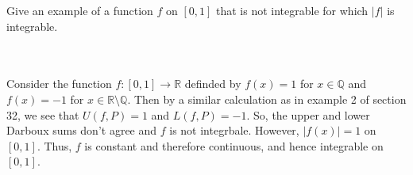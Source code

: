 Give an example of a function $f$ on $[0,1]$ that is not integrable for which $|f|$ is integrable.\\\\

\begin{solution}\renewcommand{\qedsymbol}{}\ \\
    Consider the function $f:[0,1]\rightarrow\mathbb{R}$ definded by $f(x)=1$ for $x\in\mathbb{Q}$ and
    $f(x)=-1$ for $x\in\mathbb{R}\setminus\mathbb{Q}$. Then by a similar calculation as in example 2 of
    section 32, we see that $U(f,P)=1$ and $L(f,P)=-1$. So, the upper and lower Darboux sums don't agree
    and $f$ is not integrbale. However, $|f(x)|=1$ on $[0,1]$. Thus, $f$ is constant and therefore
    continuous, and hence integrable on $[0,1]$.

\end{solution}